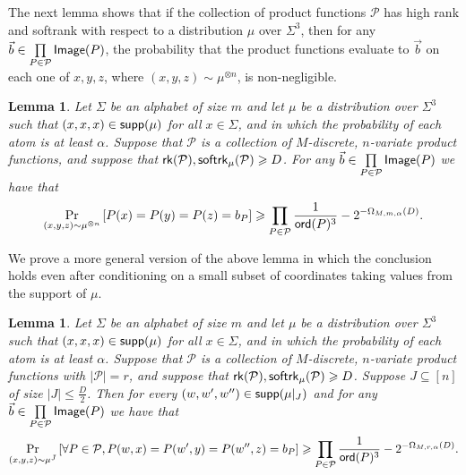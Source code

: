 \documentclass[11pt]{article}
\newtheorem{lemma}[thm]{Lemma}
\newcommand\Prob[2]{{\Pr_{#1}\left[ {#2} \right]}}
\renewcommand\geq{\geqslant}
\renewcommand\leq{\leqslant}
\begin{document}
    The next lemma shows that if the collection of product functions $\mathcal{P}$ has high rank and softrank with respect to a distribution $\mu$ over $\Sigma^3$, then 
    for any $\vec{b}\in\prod\limits_{P\in\mathcal{P}}{\sf Image}(P)$, the probability that the product functions evaluate to $\vec{b}$ on each one of $x, y, z$, where $(x,y,z)\sim \mu^{\otimes n}$, is non-negligible.
    \begin{lemma}
        Let $\Sigma$ be an alphabet of size $m$ and let $\mu$ be a distribution over $\Sigma^{3}$ such that $(x,x,x)\in {\sf supp}(\mu)$ for all $x\in\Sigma$, and in which the probability of each atom is at least $\alpha$.
        Suppose that $\mathcal{P}$ is a collection of $M$-discrete, $n$-variate product functions, and suppose that ${\sf rk}(\mathcal{P}),{\sf softrk}_{\mu}(\mathcal{P})\geq D$. 
        For any $\vec{b}\in\prod\limits_{P\in\mathcal{P}}{\sf Image}(P)$ we have that
        \[
        \Prob{(x,y,z)\sim\mu^{\otimes n}}{P(x)=P(y)=P(z) = b_P}
        \geq \prod\limits_{P\in\mathcal{P}}\frac{1}{{\sf ord}(P)^3}-2^{-\Omega_{M,m,\alpha}(D)}.
        \]
    \end{lemma}


    We prove a more general version of the above lemma in which the conclusion holds even after conditioning on a small subset of coordinates taking values from the support of $\mu$.

    \begin{lemma}
    \label{lemma:quasirandom_prop_2}
		Let $\Sigma$ be an alphabet of size $m$ and let $\mu$ be a distribution over $\Sigma^{3}$ such that $(x,x,x)\in {\sf supp}(\mu)$ for all $x\in\Sigma$, and in which the probability of each atom is at least $\alpha$.
		Suppose that $\mathcal{P}$ is a collection of $M$-discrete, $n$-variate product functions with $|\mathcal{P}|=r$, and suppose that ${\sf rk}(\mathcal{P}),{\sf softrk}_{\mu}(\mathcal{P})\geq D$. Suppose $J\subseteq [n]$ of size $|J|\leq \frac{D}{2}$. Then for every $(w, w', w'') \in {\sf supp}(\mu|_{J})$ and 
		for any $\vec{b}\in\prod\limits_{P\in\mathcal{P}}{\sf Image}(P)$ we have that
		\[
		\Prob{(x,y,z)\sim\mu^{\bar{J}}}{\forall P\in \mathcal{P}, P(w,x)=P(w', y)=P(w'', z) = b_P}
		\geq \prod\limits_{P\in\mathcal{P}}\frac{1}{{\sf ord}(P)^3}-2^{-\Omega_{M,r,\alpha}(D)}.
		\]
	\end{lemma}
\end{document}
